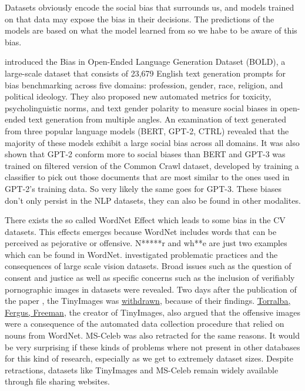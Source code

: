 \documentclass[
]{krantz}
\begin{document}
Datasets obviously encode the social bias that surrounds us, and models trained on that data may expose the bias in their decisions. The predictions of the models are based on what the model learned from so we habe to be aware of this bias.

\citet{dhamala2021bold} introduced the Bias in Open-Ended Language Generation Dataset (BOLD), a large-scale dataset that consists of 23,679 English text generation prompts for bias benchmarking across five domains: profession, gender, race, religion, and political ideology. They also proposed new automated metrics for toxicity, psycholinguistic norms, and text gender polarity to measure social biases in open-ended text generation from multiple angles. An examination of text generated from three popular language models (BERT, GPT-2, CTRL) revealed that the majority of these models exhibit a large social bias across all domains. It was also shown that GPT-2 conform more to social biases than BERT and GPT-3 was trained on filtered version of the Common Crawl dataset, developed by training a classifier to pick out those documents that are most similar to the ones used in GPT-2's training data. So very likely the same goes for GPT-3. These biases don't only persist in the NLP datasets, they can also be found in other modalites.

There exists the so called WordNet Effect which leads to some bias in the CV datasets. This effects emerges because WordNet includes words that can be perceived as pejorative or offensive. N*****r and wh**e are just two examples which can be found in WordNet. \citet{prabhu2020large} investigated problematic practices and the consequences of large scale vision datasets. Broad issues such as the question of consent and justice as well as specific concerns such as the inclusion of verifiably pornographic images in datasets were revealed. Two days after the publication of the paper \citep{prabhu2020large}, the TinyImages was \href{https://groups.csail.mit.edu/vision/TinyImages/}{withdrawn}, because of their findings. \href{https://groups.csail.mit.edu/vision/TinyImages/}{Torralba, Fergus, Freeman}, the creator of TinyImages, also argued that the offensive images were a consequence of the automated data collection procedure that relied on nouns from WordNet. MS-Celeb \citep{guo2016ms} was also retracted for the same reasons. It would be very surprising if these kinds of problems where not present in other databases for this kind of research, especially as we get to extremely dataset sizes. Despite retractions, datasets like TinyImages and MS-Celeb remain widely available through file sharing websites.
\end{document}
